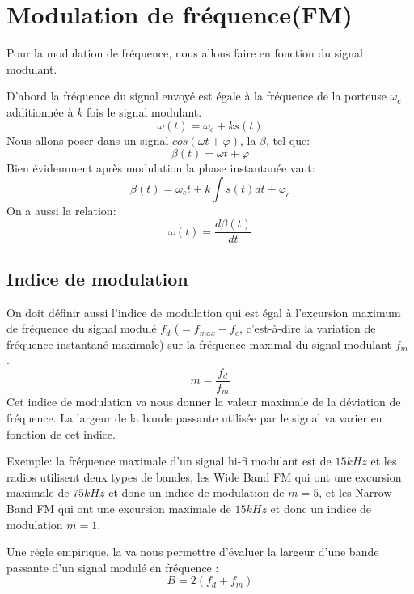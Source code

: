\section{Modulation de fréquence(FM)}

Pour la modulation de fréquence, nous allons faire  en fonction du signal modulant.

D'abord la fréquence du signal envoyé est égale à la fréquence de la porteuse $\omega_c$ additionnée à $k$ fois le signal modulant.
\begin{equation*}
\omega (t) = \omega_c + ks(t)
\end{equation*}
Nous allons poser dans un signal $cos(\omega t + \varphi)$, la  $\beta$, tel que:
\begin{equation*}
\beta (t) = \omega t + \varphi
\end{equation*}
Bien évidemment après modulation la phase instantanée vaut:
\begin{equation*}
\beta (t) = \omega_c t + k \int s(t) dt + \varphi_c
\end{equation*}
On a aussi la relation:
\begin{equation*}
\omega (t) = \frac{d\beta (t)}{dt}
\end{equation*}
\subsection{Indice de modulation}

On doit définir aussi l'indice de modulation qui est égal à l'excursion maximum de fréquence du signal modulé $f_d$ ($= f_{max} - f_c$, c'est-à-dire la variation de fréquence instantané maximale) sur la fréquence maximal du signal modulant $f_m$ .
\begin{equation*}
m = \frac{f_d}{f_m}
\end{equation*}
Cet indice de modulation va nous donner la valeur maximale de la déviation de fréquence. La largeur de la bande passante utilisée par le signal va varier en fonction de cet indice.

Exemple: la fréquence maximale d'un signal hi-fi modulant est de $15 kHz$ et les radios utilisent deux types de bandes, les Wide Band FM qui ont une excursion maximale de $75 kHz$ et donc un indice de modulation de $m=5$, et les Narrow Band FM qui ont une excursion maximale de $15 kHz$ et donc un indice de modulation $m=1$.

Une règle empirique, la  va nous permettre d'évaluer la largeur d'une bande passante d'un signal modulé en fréquence :
\begin{equation*}
B = 2(f_d + f_m)
\end{equation*}

